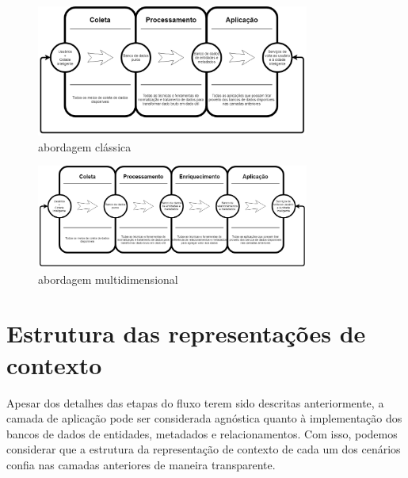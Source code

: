 \begin{figure}[h]
\caption{abordagem clássica}
\centering
\includegraphics[width=0.8\textwidth]{images/PoorFlow.png}
\end{figure}

\begin{figure}[h]
\caption{abordagem multidimensional}
\centering
\includegraphics[width=0.8\textwidth]{images/FullFlow.png}
\end{figure}

\section{Estrutura das representações de contexto}

Apesar dos detalhes das etapas do fluxo terem sido descritas anteriormente, a camada de aplicação pode ser considerada agnóstica quanto à implementação dos bancos de dados de entidades, metadados e relacionamentos. Com isso, podemos considerar que a estrutura da representação de contexto de cada um dos cenários confia nas camadas anteriores de maneira transparente.

\newpage

